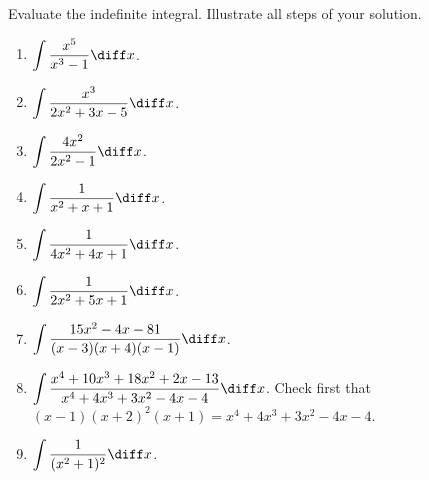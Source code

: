 Evaluate the indefinite integral. Illustrate all steps of your solution. 
\begin{multicols}{2}
\begin{enumerate}
\item $\displaystyle \int \frac{x^5 }{x^3-1}\diff x$.
\item $\displaystyle\int \frac{x^3 }{2x^2+3x-5}\diff x$.
\item $\displaystyle\int \frac{4x^2 }{2x^2-1}\diff x$.
\item $\displaystyle\int \frac{1}{x^2+x+1}\diff x$.
\item $\displaystyle\int \frac{1}{4x^2+4x+1}\diff x$.
\item $\displaystyle\int \frac{1}{2x^2+5x+1}\diff x$.
\item $\displaystyle\int \frac{15x^2-4x-81}{ (x-3)(x +4)(x-1)}\diff x$.
\item $\displaystyle\int \frac {x^{4}+10x^{3}+18x^{2}+2x- 13}{x^{4} +4x^{3} +3x^{2}- 4x-4}\diff x$. 
Check first that $(x-1)(x+2)^2(x+1)= x^{4}+4x^{3}+3x^{2}-4x-4$. 
\item $\displaystyle \int \frac{1}{(x^2+1)^2}\diff x$.
\end{enumerate}
\end{multicols}